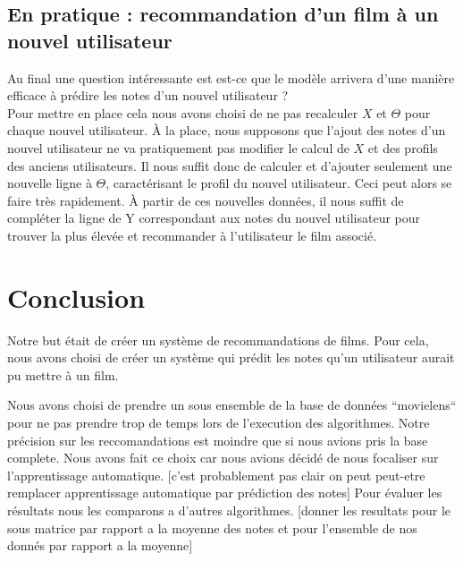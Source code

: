\documentclass[a4paper,10pt]{article}
\begin{document}
\subsection{En pratique : recommandation d'un film à un nouvel utilisateur}

Au final une question intéressante est est-ce que le modèle arrivera d'une manière efficace à prédire les notes d'un nouvel utilisateur ?\\

Pour mettre en place cela nous avons choisi de ne pas recalculer $X$ et $\Theta$ pour chaque nouvel utilisateur. À la place, nous supposons que l'ajout des notes d'un nouvel utilisateur ne va pratiquement pas modifier le calcul de $X$ et des profils des anciens utilisateurs. Il nous suffit donc de calculer et d'ajouter seulement une nouvelle ligne à $\Theta$, caractérisant le profil du nouvel utilisateur. Ceci peut alors se faire très rapidement. À partir de ces nouvelles données, il nous suffit de compléter la ligne de Y correspondant aux notes du nouvel utilisateur pour trouver la plus élevée et recommander à l'utilisateur le film associé.

\section*{Conclusion}

Notre but était de créer un système de recommandations de films. Pour cela, nous avons choisi de créer un système qui prédit les notes qu'un utilisateur aurait pu mettre à un film. 

Nous avons %
choisi de prendre un sous ensemble de la base de données ``movielens``
pour ne pas prendre trop de temps lors de l'execution des algorithmes. %
Notre précision sur les reccomandations est moindre que si nous avions pris la
base complete. Nous avons fait ce choix car nous avions décidé de nous 
focaliser sur l'apprentissage automatique. [c'est probablement pas clair on peut peut-etre remplacer apprentissage automatique par prédiction des notes]
Pour évaluer les résultats nous les comparons a d'autres algorithmes.
[donner les resultats pour le sous matrice par rapport a la moyenne des notes et pour l'ensemble de nos donnés par rapport a la moyenne]%
\end{document}
